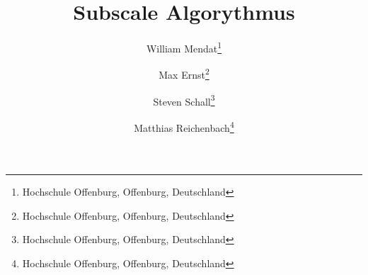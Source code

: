 \documentclass[]{lni}
\begin{document}
    \title[Ein Kurztitel]{Subscale Algorythmus}
    \author[William Mendat \and Max Ernst \and Steven Schall \and Matthias Reichenbach]
    {William Mendat\footnote{Hochschule Offenburg, Offenburg,
        Deutschland } \and
    Max Ernst\footnote{Hochschule Offenburg, Offenburg,
        Deutschland } \and
    Steven Schall\footnote{Hochschule Offenburg, Offenburg,
        Deutschland } \and
    Matthias Reichenbach\footnote{Hochschule Offenburg, Offenburg,
        Deutschland }}
    \maketitle

    
    
    
    
    
    
    


\end{document}
